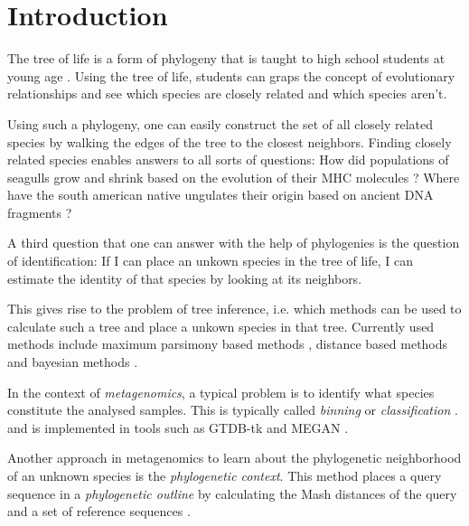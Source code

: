 
\chapter{Introduction}
  \label{sec:intro}

The tree of life is a form of phylogeny that is taught to high school students
at young age \cite{bildungsplanBiologie2015}. Using the tree of life, students
can graps the concept of evolutionary relationships and see which species are
closely related and which species aren't. 

Using such a phylogeny, one can easily construct the set of all closely related
species by walking the edges of the tree to the closest neighbors. Finding
closely related species enables answers to all sorts of questions: How did
populations of seagulls grow and shrink based on the evolution of their MHC
molecules \cite{mancilla-moralesCharacterizationSelectionTransSpecies2022}?
Where have the south american native ungulates their origin based on ancient DNA
fragments \cite{welkerAncientProteinsResolve2015}?

A third question that one can answer with the help of phylogenies is the
question of identification: If I can place an unkown species in the tree of
life, I can estimate the identity of that species by looking at its neighbors.

This gives rise to the problem of tree inference, i.e. which methods can be used
to calculate such a tree and place a unkown species in that tree. Currently used
methods include maximum parsimony based methods
\cite{sankoffMinimalMutationTrees1975}, distance based methods
\cite{saitouNeighborjoiningMethodNew1987} and bayesian methods
\cite{huelsenbeckMRBAYESBayesianInference2001}. 

In the context of \textit{metagenomics}, a typical problem is to identify what
species constitute the analysed samples. This is typically called \textit{binning}
or \textit{classification} \cite{kuninBioinformaticianGuideMetagenomics2008}.
and is implemented in tools such as GTDB-tk
\cite{chaumeilGTDBTkToolkitClassify2020} and MEGAN
\cite{husonMEGANLRNewAlgorithms2018}.

Another approach in metagenomics to learn about the phylogenetic neighborhood of
an unknown species is the \textit{phylogenetic context}. This method places a
query sequence in a \textit{phylogenetic outline} by calculating the Mash
distances of the query and a set of reference sequences
\cite{bagciMicrobialPhylogeneticContext2021}. 

